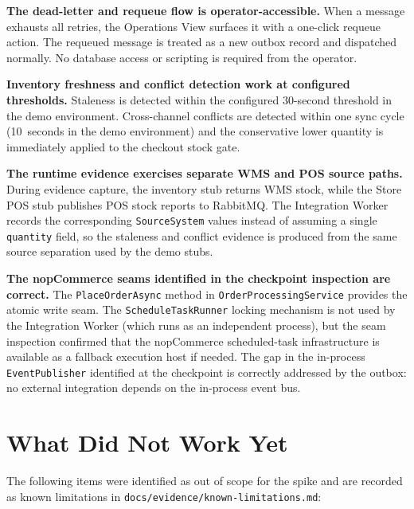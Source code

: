 \textbf{The dead-letter and requeue flow is operator-accessible.} When a message exhausts
all retries, the Operations View surfaces it with a one-click requeue action. The requeued
message is treated as a new outbox record and dispatched normally. No database access or
scripting is required from the operator.

\textbf{Inventory freshness and conflict detection work at configured thresholds.} Staleness
is detected within the configured 30-second threshold in the demo environment. Cross-channel
conflicts are detected within one sync cycle (10~seconds in the demo environment) and the
conservative lower quantity is immediately applied to the checkout stock gate.

\textbf{The runtime evidence exercises separate WMS and POS source paths.} During evidence
capture, the inventory stub returns WMS stock, while the Store POS stub publishes POS stock
reports to RabbitMQ. The Integration Worker records the corresponding \texttt{SourceSystem}
values instead of assuming a single \texttt{quantity} field, so the staleness and conflict
evidence is produced from the same source separation used by the demo stubs.

\textbf{The nopCommerce seams identified in the checkpoint inspection are correct.} The
\texttt{PlaceOrderAsync} method in \texttt{OrderProcessingService} provides the atomic
write seam. The \texttt{ScheduleTaskRunner} locking mechanism is not used by the Integration
Worker (which runs as an independent process), but the seam inspection confirmed that the
nopCommerce scheduled-task infrastructure is available as a fallback execution host if needed.
The gap in the in-process \texttt{EventPublisher} identified at the checkpoint is correctly
addressed by the outbox: no external integration depends on the in-process event bus.

\section{What Did Not Work Yet}

The following items were identified as out of scope for the spike and are recorded as known
limitations in \texttt{docs/evidence/known-limitations.md}:

